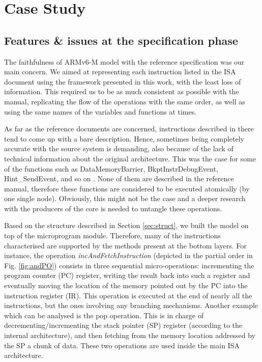 \documentclass[conference]{IEEEtran}
\begin{document}
\section{Case Study}
\label{sec:arm}

\subsection{Features \& issues at the specification phase}
The faithfulness of ARMv6-M model with the reference specification was our main concern.
We aimed at representing each instruction listed in the ISA document using the
framework presented in this work, with the least loss of information. This required us to be
as much consistent as possible with the manual, replicating the flow of the operations with
the same order, as well as using the same names of the variables and functions at times.

As far as the reference documents are concerned, instructions described in there tend to come
up with a bare description. Hence, sometimes being completely accurate with 
the source system is demanding, also because of the lack of technical information about the
original architecture. This was the case for some of the functions such as DataMemoryBarrier,
BkptInstrDebugEvent, Hint\_SendEvent, and so on \cite{armManual}.
None of them are described in the reference manual, therefore these
functions are considered to be executed atomically (by one single node). Obviously, this
might not be the case and a deeper research with the producers of the core is needed to
untangle these operations.

Based on the structure described in Section \ref{sec:struct}, we built the model on top of
the microprogram module. Therefore, many of the instructions characterised are supported by
the methods present at the bottom layers. For instance, the operation
\textit{incAndFetchInstruction} (depicted in the partial order in Fig. \ref{fig:andPO})
consists in three sequential micro-operations: incrementing the program counter (PC)
register, writing the result back into such a register and eventually moving the location of
the memory pointed out by the PC into the instruction register (IR). This operation is
executed at the end of nearly all the instructions, but the ones involving any branching
mechanisms. Another example which can be analysed is the pop operation. This is in charge of
decrementing/incrementing the stack pointer (SP) register (according to the internal
architecture), and then fetching from the memory location addressed by the SP a chunk of 
data. These two operations are used inside the main ISA architecture.
\end{document}
